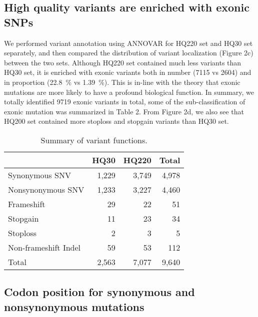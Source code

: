 \documentclass[a4paper, 12pt]{article}
\begin{document}
			\subsection*{High quality variants are enriched with exonic SNPs}
			
				We performed variant annotation using ANNOVAR for HQ220 set and HQ30 set separately, and then compared the distribution of variant localization (Figure 2c) between the two sets. Although HQ220 set contained much less variants than HQ30 set, it is enriched with exonic variants both in number (7115 vs 2604) and in proportion (22.8~\% vs 1.39~\%). This is in-line with the theory that exonic mutations are more likely to have a profound biological function. In summary, we totally identified 9719 exonic variants in total, some of the sub-classification of exonic mutation was summarized in Table 2. From Figure 2d, we also see that HQ200 set contained more stoploss and stopgain variants than HQ30 set.
				\\
				
			\begin{table}[!htbp]
				\captionsetup{singlelinecheck=false, justification=raggedright, labelsep=period}
				\caption{Summary of variant functions.}
				\begin{tabular}{lrrr}
					\toprule
						\textbf{} &	\textbf{HQ30} & \textbf{HQ220} & \textbf{Total}
					\\\midrule
						Synonymous SNV & 1,229 & 3,749 & 4,978
					\\	Nonsynonymous SNV & 1,233 & 3,227 & 4,460
					\\	Frameshift & 29 & 22 & 51
					\\	Stopgain & 11 & 23 & 34
					\\	Stoploss & 2 & 3 & 5
					\\	Non-frameshift Indel & 59 & 53 & 112
					\\\midrule
						Total & 2,563 & 7,077 & 9,640
					\\\bottomrule
				\end{tabular}
			\end{table}
				
			\subsection*{Codon position for synonymous and nonsynonymous mutations}
			
\end{document}

